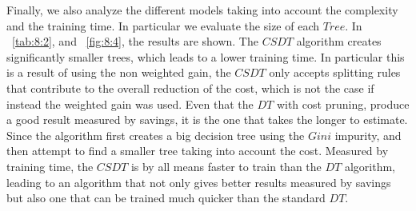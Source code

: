   
Finally, we also analyze the different models taking into account the complexity and the 
training time. In particular we evaluate the size of each $Tree$. In \tablename{~\ref{tab:8:2}}, 
and \figurename{~\ref{fig:8:4}}, the results are shown. The $CSDT$ algorithm creates significantly 
smaller trees, which leads to a lower training time. In particular this is a result of using the 
non weighted gain, the $CSDT$ only accepts splitting rules that contribute to the overall reduction 
of the cost, which is not the case if instead the weighted gain was used. Even that the $DT$ 
with cost pruning, produce a good result measured by savings, it is the one that takes the 
longer to estimate. Since the algorithm first creates a big decision tree using the $Gini$ 
impurity, and then attempt to find a smaller tree taking into account the cost. Measured by 
training time, the $CSDT$ is by all means faster to train than the $DT$ algorithm, leading to 
an algorithm that not only gives better results measured by savings but also one that can be 
trained much quicker than the standard $DT$.
